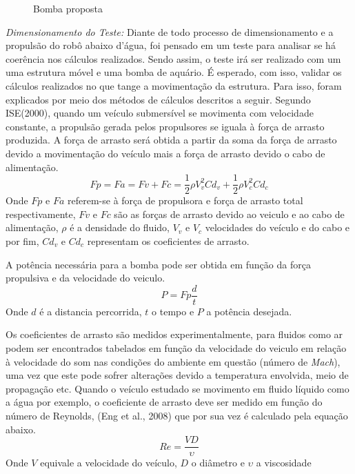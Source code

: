 \begin{description}
\begin{figure}[h]
  \caption{Bomba proposta}
  \label{fig:waterbomb}
\end{figure}
\FloatBarrier
\par
\textit{Dimensionamento do Teste:} Diante de todo processo de dimensionamento
e a propulsão do robô abaixo d’água, foi pensado em um teste para analisar se
há coerência nos cálculos realizados. Sendo assim, o teste irá ser realizado
com um uma estrutura móvel e uma bomba de aquário. É esperado, com isso, validar
os cálculos realizados no que tange a movimentação da estrutura. Para isso,
foram explicados por meio dos métodos de cálculos descritos a seguir. Segundo
ISE(2000), quando um veículo submersível se movimenta com velocidade constante,
a propulsão gerada pelos propulsores se iguala à força de arrasto produzida. A
força de arrasto será obtida a partir da soma da força de arrasto devido a 
movimentação do veículo mais a força de arrasto devido o cabo de alimentação.
\begin{displaymath}
  Fp = Fa = Fv + Fc = \frac{1}{2}\rho V^{2}_{v}Cd_{v} + \frac{1}{2}\rho V^{2}_{c}Cd_{c}
\end{displaymath}
Onde $Fp$ e $Fa$ referem-se à força de propulsora e força de arrasto total
respectivamente, $Fv$ e $Fc$ são as forças de arrasto devido ao veiculo e ao cabo de
alimentação, $\rho$ é a densidade do fluido, $V_{v}$ e $V_{c}$ velocidades do
veículo e do cabo e por fim, $Cd_{v}$ e $Cd_{c}$ representam os coeficientes
de arrasto.
\par
A potência necessária para a bomba pode ser obtida em função da força propulsiva
e da velocidade do veiculo.
\begin{displaymath}
  P = Fp\frac{d}{t}
\end{displaymath}
Onde $d$ é a distancia percorrida, $t$ o tempo e $P$ a potência desejada.
\par
Os coeficientes de arrasto são medidos experimentalmente, para fluidos como
ar podem ser encontrados tabelados em função da velocidade do veiculo em relação
à velocidade do som nas condições do ambiente em questão (número de \textit{Mach}), uma
vez que este pode sofrer alterações devido a temperatura envolvida, meio de
propagação etc. Quando o veículo estudado se movimento em fluido líquido como a
água por exemplo, o coeficiente de arrasto deve ser medido em função do número
de Reynolds, (Eng et al., 2008) que por sua vez é calculado pela equação abaixo.
\begin{displaymath}
  Re = \frac{VD}{\upsilon}
\end{displaymath}
Onde $V$ equivale a velocidade do veículo, $D$ o diâmetro e $\upsilon$ a viscosidade

\end{description}
